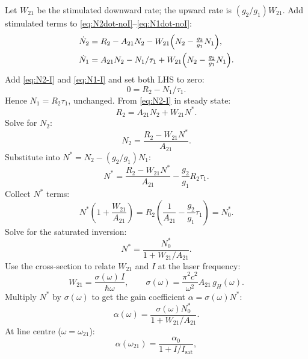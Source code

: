 \documentclass[11pt]{article}
\begin{document}
Let $W_{21}$ be the stimulated downward rate; the upward rate is $(g_{2}/g_{1})W_{21}$. Add stimulated terms to \eqref{eq:N2dot-noI}--\eqref{eq:N1dot-noI}:
\begin{align}
\dot N_{2}&=R_{2}-A_{21}N_{2}-W_{21}\Bigl(N_{2}-\tfrac{g_{2}}{g_{1}}N_{1}\Bigr),\label{eq:N2-I}\\
\dot N_{1}&=A_{21}N_{2}-N_{1}/\tau_{1}+W_{21}\Bigl(N_{2}-\tfrac{g_{2}}{g_{1}}N_{1}\Bigr).
\label{eq:N1-I}
\end{align}
Add \eqref{eq:N2-I} and \eqref{eq:N1-I} and set both LHS to zero:
\begin{equation}
0=R_{2}-N_{1}/\tau_{1}.
\end{equation}
Hence $N_{1}=R_{2}\tau_{1}$, unchanged. From \eqref{eq:N2-I} in steady state:
\begin{equation}
R_{2}=A_{21}N_{2}+W_{21}N^{*}.
\end{equation}
Solve for $N_{2}$:
\begin{equation}
N_{2}=\frac{R_{2}-W_{21}N^{*}}{A_{21}}.
\end{equation}
Substitute into $N^{*}=N_{2}-(g_{2}/g_{1})N_{1}$:
\begin{equation}
N^{*}=\frac{R_{2}-W_{21}N^{*}}{A_{21}}-\frac{g_{2}}{g_{1}}R_{2}\tau_{1}.
\end{equation}
Collect $N^{*}$ terms:
\begin{equation}
N^{*}\!\left(1+\frac{W_{21}}{A_{21}}\right)=R_{2}\!\left(\frac{1}{A_{21}}-\frac{g_{2}}{g_{1}}\tau_{1}\right)=N_{0}^{*}.
\end{equation}
Solve for the saturated inversion:
\begin{equation}
N^{*}=\frac{N_{0}^{*}}{1+W_{21}/A_{21}}.
\label{eq:NS-sat}
\end{equation}
Use the cross-section to relate $W_{21}$ and $I$ at the laser frequency:
\begin{equation}
W_{21}=\frac{\sigma(\omega)\,I}{\hbar\omega},\qquad \sigma(\omega)=\frac{\pi^{2}c^{2}}{\omega^{2}}A_{21}\,g_{H}(\omega).
\label{eq:W21-cross}
\end{equation}
Multiply $N^{*}$ by $\sigma(\omega)$ to get the gain coefficient $\alpha=\sigma(\omega)N^{*}$:
\begin{equation}
\alpha(\omega)=\frac{\sigma(\omega)N_{0}^{*}}{1+W_{21}/A_{21}}.
\end{equation}
At line centre ($\omega=\omega_{21}$):
\begin{equation}
\boxed{\;\alpha(\omega_{21})=\frac{\alpha_{0}}{1+I/I_{\mathrm{sat}}},\;}
\label{eq:gain-sat}
\end{equation}
\end{document}
